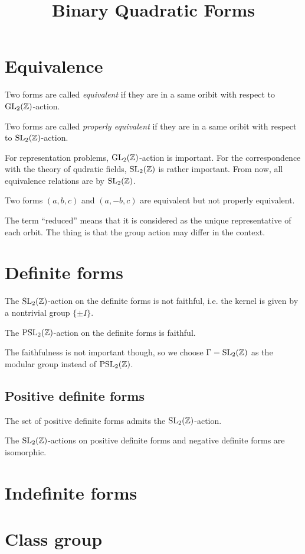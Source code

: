 \documentclass{../exp}
\title{Binary Quadratic Forms}
\begin{document}
\maketitle

\section{Equivalence}


\begin{defn}
Two forms are called \emph{equivalent} if they are in a same oribit with respect to $\mathrm{GL}_2(\mathbb{Z})$-action.
\end{defn}

\begin{defn}
Two forms are called \emph{properly equivalent} if they are in a same oribit with respect to $\mathrm{SL}_2(\mathbb{Z})$-action.
\end{defn}

For representation problems, $\mathrm{GL}_2(\mathbb{Z})$-action is important.
For the correspondence with the theory of qudratic fields, $\mathrm{SL}_2(\mathbb{Z})$ is rather important.
From now, all equivalence relations are by $\mathrm{SL}_2(\mathbb{Z})$.

\begin{ex}
Two forms $(a,b,c)$ and $(a,-b,c)$ are equivalent but not properly equivalent.
\end{ex}
The term ``reduced'' means that it is considered as the unique representative of each orbit.
The thing is that the group action may differ in the context.

\section{Definite forms}

\begin{prop}
The $\mathrm{SL}_2(\mathbb{Z})$-action on the definite forms is not faithful, i.e. the kernel is given by a nontrivial group $\{\pm I\}$.
\end{prop}
\begin{prop}
The $\mathrm{PSL}_2(\mathbb{Z})$-action on the definite forms is faithful.
\end{prop}
The faithfulness is not important though, so we choose $\Gamma=\mathrm{SL}_2(\mathbb{Z})$ as the modular group instead of $\mathrm{PSL}_2(\mathbb{Z})$.

\subsection{Positive definite forms}
\begin{prop}
The set of positive definite forms admits the $\mathrm{SL}_2(\mathbb{Z})$-action.
\end{prop}
\begin{prop}
The $\mathrm{SL}_2(\mathbb{Z})$-actions on positive definite forms and negative definite forms are isomorphic.
\end{prop}



\section{Indefinite forms}


\section{Class group}
\end{document}
